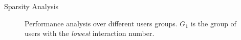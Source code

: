 \documentclass[t]{beamer}
\begin{document}
\begin{frame}{Sparsity Analysis}
\begin{figure}[!t]
  \centering

\qquad

  \caption{Performance analysis over different users groups.
  $G_1$ is the group of users with the \textit{lowest} interaction number.}
  \label{fig:group-analysis}
\end{figure}
 
\end{frame}
\end{document}
